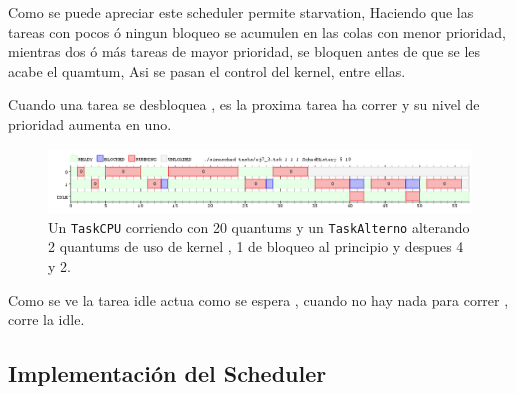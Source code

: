 	Como se puede apreciar este scheduler permite starvation, Haciendo que las tareas con pocos ó ningun bloqueo se acumulen en las colas con menor prioridad, mientras dos ó más tareas de mayor prioridad, se bloquen antes de que se les acabe el quamtum, Asi se pasan el control del kernel, entre ellas.
	
	Cuando una tarea se desbloquea , es la proxima tarea ha correr y su nivel de prioridad aumenta en uno.

	\begin{figure}[ht]
		\begin{center}
			\includegraphics[width=1\columnwidth]{imagenes/ej7_3.png}
			\caption{Un \texttt{TaskCPU} corriendo con 20 quantums y un \texttt{TaskAlterno} alterando 2 quantums de uso de kernel , 1 de bloqueo al principio y despues 4 y 2.}
		\end{center}
	\end{figure}

	Como se ve la tarea idle  actua como se espera , cuando no hay nada para correr , corre la idle.

	

\newpage

	\subsection{Implementación del Scheduler}

